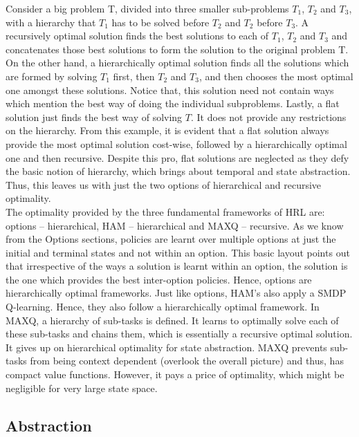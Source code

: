 Consider a big problem T, divided into three smaller sub-problems $T_1$, $T_2$ and $T_3$, with a hierarchy that $T_1$ has to be solved before $T_2$ and $T_2$ before $T_3$. A recursively optimal solution finds the best solutions to each of $T_1$, $T_2$ and $T_3$ and concatenates those best solutions to form the solution to the original problem T. On the other hand, a hierarchically optimal solution finds all the solutions which are formed by solving $T_1$ first, then $T_2$ and $T_3$, and then chooses the most optimal one amongst these solutions. Notice that, this solution need not contain ways which mention the best way of doing the individual subproblems. Lastly, a flat solution just finds the best way of solving $T$. It does not provide any restrictions on the hierarchy. From this example, it is evident that a flat solution always provide the most optimal solution cost-wise, followed by a hierarchically optimal one and then recursive. Despite this pro, flat solutions are neglected as they defy the basic notion of hierarchy, which brings about temporal and state abstraction. Thus, this leaves us with just the two options of hierarchical and recursive optimality. \\

The optimality provided by the three fundamental frameworks of HRL are: options – hierarchical, HAM – hierarchical and MAXQ – recursive.	As we know from the Options sections, policies are learnt over multiple options at just the initial and terminal states and not within an option. This basic layout points out that irrespective of the ways a solution is learnt within an option, the solution is the one which provides the best inter-option policies. Hence, options are hierarchically optimal frameworks. Just like options, HAM’s also apply a SMDP Q-learning. Hence, they also follow a hierarchically optimal framework. In MAXQ, a hierarchy of sub-tasks is defined. It learns to optimally solve each of these sub-tasks and chains them, which is essentially a recursive optimal solution. It gives up on hierarchical optimality for state abstraction. MAXQ prevents sub-tasks from being context dependent (overlook the overall picture) and thus, has compact value functions. However, it pays a price of optimality, which might be negligible for very large state space. \\


\subsection{Abstraction}


